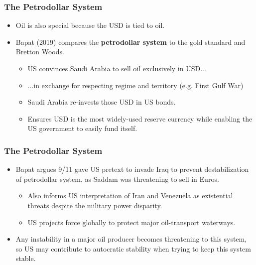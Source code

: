 \documentclass[handout]{beamer}
\begin{document}
\begin{frame} 
	\frametitle{\LARGE{The Petrodollar System}}
	\begin{itemize}
		
		\item Oil is also special because the USD is tied to oil. \pause 
		\item Bapat (2019) compares the \textbf{petrodollar system} to the gold standard and Bretton Woods. \pause 
		\begin{itemize}
			\item US convinces Saudi Arabia to sell oil exclusively in USD... \pause 
			\item ...in exchange for respecting regime and territory (e.g. First Gulf War) \pause 
			\item Saudi Arabia re-invests those USD in US bonds.  \pause 
			\item Ensures USD is the most widely-used reserve currency while enabling the US government to easily fund itself.   
		\end{itemize}
		
	\end{itemize}
\end{frame}


\begin{frame} 
	\frametitle{\LARGE{The Petrodollar System}}
	\begin{itemize}
		
		\item Bapat argues 9/11 gave US pretext to invade Iraq to prevent destabilization of petrodollar system, as Saddam was threatening to sell in Euros.  \pause 
		\begin{itemize}
			\item Also informs US interpretation of Iran and Venezuela as existential threats despite the military power disparity.  \pause 
			\item US projects force globally to protect major oil-transport waterways. \pause 
		\end{itemize}
		\item Any instability in a major oil producer becomes threatening to this system, so US may contribute to autocratic stability when trying to keep this system stable.
		
	\end{itemize}
\end{frame}


\end{document}
